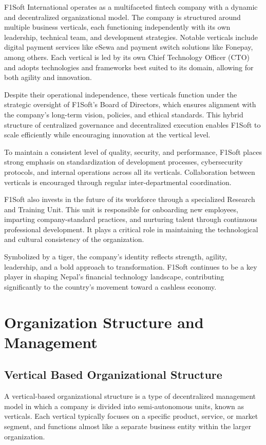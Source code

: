 \documentclass[12pt, a4paper]{report}
\begin{document}
F1Soft International operates as a multifaceted fintech company with a dynamic and decentralized organizational model. The company is structured around multiple business verticals, each functioning independently with its own leadership, technical team, and development strategies. Notable verticals include digital payment services like eSewa and payment switch solutions like Fonepay, among others. Each vertical is led by its own Chief Technology Officer (CTO) and adopts technologies and frameworks best suited to its domain, allowing for both agility and innovation.

Despite their operational independence, these verticals function under the strategic oversight of F1Soft’s Board of Directors, which ensures alignment with the company’s long-term vision, policies, and ethical standards. This hybrid structure of centralized governance and decentralized execution enables F1Soft to scale efficiently while encouraging innovation at the vertical level.

To maintain a consistent level of quality, security, and performance, F1Soft places strong emphasis on standardization of development processes, cybersecurity protocols, and internal operations across all its verticals. Collaboration between verticals is encouraged through regular inter-departmental coordination.

F1Soft also invests in the future of its workforce through a specialized Research and Training Unit. This unit is responsible for onboarding new employees, imparting company-standard practices, and nurturing talent through continuous professional development. It plays a critical role in maintaining the technological and cultural consistency of the organization.

Symbolized by a tiger, the company’s identity reflects strength, agility, leadership, and a bold approach to transformation. F1Soft continues to be a key player in shaping Nepal’s financial technology landscape, contributing significantly to the country’s movement toward a cashless economy.

\chapter{Organization Structure and Management}
\section{Vertical Based Organizational Structure}
A vertical-based organizational structure is a type of decentralized management model in which a company is divided into semi-autonomous units, known as verticals. Each vertical typically focuses on a specific product, service, or market segment, and functions almost like a separate business entity within the larger organization.
\end{document}

